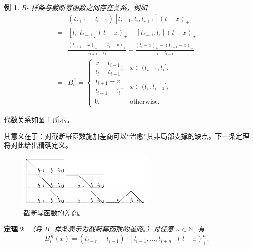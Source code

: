 \documentclass[a4paper]{ctexart}
\newtheorem{theorem}{定理}
\newtheorem{example}[theorem]{例}
\numberwithin{theorem}{section}
\numberwithin{equation}{section}
\numberwithin{figure}{section}
\numberwithin{remark}{section}
\begin{document}
\begin{example}
    \label{ex::relation_bspline_truncated_power}
B- 样条与截断幂函数之间存在关系，例如
\begin{equation*}
    \begin{aligned}
&(t_{i+1}-t_{i-1})[t_{i-1},t_i,t_{i+1}](t-x)_{+}\\
=&[t_i,t_{i+1}](t-x)_{+}-[t_{i-1},t_i](t-x)_{+} \\
=&\frac{(t_{i+1}-x)_{+}-(t_{i}-x)_{+}}{t_{i+1}-t_i} 
-\frac{(t_{i}-x)_{+}-(t_{i-1}-x)_{+}}{t_i-t_{i-1}} \\
=&B^{\,1}_i
=
\begin{cases}
\dfrac{x-t_{i-1}}{t_i-t_{i-1}}, & x\in(t_{i-1},t_i],\\
\dfrac{t_{i+1}-x}{t_{i+1}-t_i}, & x\in(t_i,t_{i+1}],\\
0, & \text{otherwise}.
\end{cases}
\end{aligned}
\end{equation*}
\end{example}

代数关系如图 \ref{fig::dd_truncated_power} 所示。

其意义在于：对截断幂函数施加差商可以“治愈”其非局部支撑的缺点。下一条定理将对此给出精确定义。

\begin{figure}[h]
\centering
\includegraphics[width=0.6\textwidth]{images/truncated_power_functions.png}
\caption{截断幂函数的差商。}
\label{fig::dd_truncated_power}
\end{figure}

\begin{theorem}
    \label{thm::bspline_as_divdiff_truncated}
（将 B- 样条表示为截断幂函数的差商。）对任意 $n\in\mathbb{N}$, 有
\begin{equation}
\label{eq::Bn_divdiff_truncated}
B^{\,n}_i(x)=(t_{i+n}-t_{i-1})\cdot [t_{i-1},\ldots,t_{i+n}](t-x)^{n}_{+}.
\end{equation}
\end{theorem}
\end{document}
